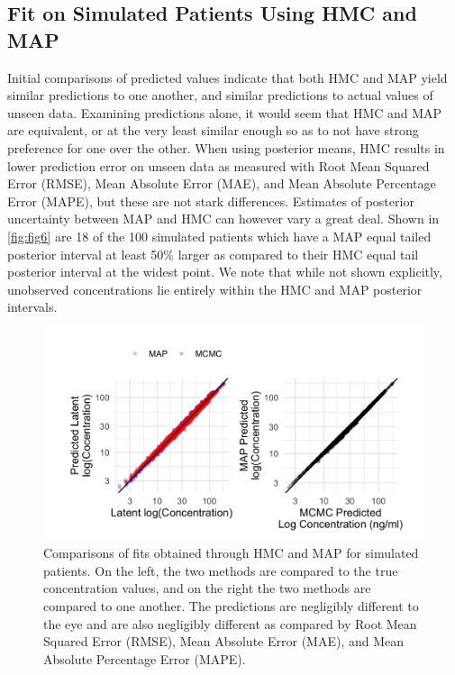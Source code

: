 \subsection*{Fit on Simulated Patients Using HMC and MAP}

Initial comparisons of predicted values indicate that both HMC and MAP yield similar predictions to one another, and similar predictions to actual values of unseen data.  Examining predictions alone, it would seem that HMC and MAP are equivalent, or at the very least similar enough so as to not have strong preference for one over the other. When using posterior means, HMC results in lower prediction error on unseen data as measured with Root Mean Squared Error (RMSE), Mean Absolute Error (MAE), and Mean Absolute Percentage Error (MAPE), but these are not stark differences. Estimates of posterior uncertainty between MAP and HMC can however vary a great deal. Shown in \cref{fig:fig6} are 18 of the 100 simulated patients which have a MAP equal tailed posterior interval at least 50\% larger as compared to their HMC equal tail posterior interval at the widest point. We note that while not shown explicitly, unobserved concentrations lie entirely within the HMC and MAP posterior intervals.

\begin{figure}
	\centering
	\includegraphics[width=0.85\linewidth]{figs/compare}
	\caption{Comparisons of fits obtained through HMC and MAP for simulated patients.  On the left, the two methods are compared to the true concentration values, and on the right the two methods are compared to one another.  The predictions are negligibly different to the eye and are also negligibly different as compared by Root Mean Squared Error (RMSE), Mean Absolute Error (MAE), and Mean Absolute Percentage Error (MAPE).}
	\label{fig:fig5}
\end{figure}


